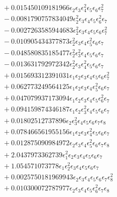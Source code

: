 \documentclass[10pt]{article}
\begin{document}
\begin{align*}
&{}  + 0.015450109181966 \epsilon_{2} \epsilon_{3} \epsilon_{4}^{2} \epsilon_{5} \epsilon_{6} \epsilon_{7}^{2} \\
&{}  - 0.0081790757834049 \epsilon_{2}^{2} \epsilon_{3} \epsilon_{4} \epsilon_{5} \epsilon_{6}^{2} \epsilon_{7} \\
&{}  - 0.0027263585944683 \epsilon_{2}^{2} \epsilon_{3} \epsilon_{4} \epsilon_{5} \epsilon_{6} \epsilon_{7}^{2} \\
&{}  - 0.010905434377873 \epsilon_{2}^{2} \epsilon_{3} \epsilon_{4} \epsilon_{5}^{2} \epsilon_{6} \epsilon_{7} \\
&{}  - 0.048580835185477 \epsilon_{2}^{2} \epsilon_{3}^{2} \epsilon_{4} \epsilon_{5} \epsilon_{6} \epsilon_{7} \\
&{}  - 0.013631792972342 \epsilon_{2}^{2} \epsilon_{3} \epsilon_{4}^{2} \epsilon_{5} \epsilon_{6} \epsilon_{7} \\
&{}  + 0.015693312391031 \epsilon_{1} \epsilon_{2} \epsilon_{3} \epsilon_{4} \epsilon_{5} \epsilon_{6} \epsilon_{7}^{2} \\
&{}  + 0.062773249564125 \epsilon_{1} \epsilon_{2} \epsilon_{3} \epsilon_{4} \epsilon_{5}^{2} \epsilon_{6} \epsilon_{7} \\
&{}  + 0.047079937173094 \epsilon_{1} \epsilon_{2} \epsilon_{3} \epsilon_{4} \epsilon_{5} \epsilon_{6}^{2} \epsilon_{7} \\
&{}  + 0.094159874346187 \epsilon_{1} \epsilon_{2} \epsilon_{3}^{2} \epsilon_{4} \epsilon_{5} \epsilon_{6} \epsilon_{7} \\
&{}  + 0.01802512737896 \epsilon_{2} \epsilon_{3}^{2} \epsilon_{4} \epsilon_{5} \epsilon_{6} \epsilon_{7} \epsilon_{8} \\
&{}  + 0.078466561955156 \epsilon_{1} \epsilon_{2} \epsilon_{3} \epsilon_{4}^{2} \epsilon_{5} \epsilon_{6} \epsilon_{7} \\
&{}  + 0.012875090984972 \epsilon_{2} \epsilon_{3} \epsilon_{4} \epsilon_{5}^{2} \epsilon_{6} \epsilon_{7} \epsilon_{8} \\
&{}  + 2.0437973362739 \epsilon_{1}^{2} \epsilon_{2} \epsilon_{3} \epsilon_{4} \epsilon_{5} \epsilon_{6} \epsilon_{7} \\
&{}  + 1.054571073778 \epsilon_{1} \epsilon_{2}^{2} \epsilon_{3} \epsilon_{4} \epsilon_{5} \epsilon_{6} \epsilon_{7} \\
&{}  + 0.0025750181969943 \epsilon_{2} \epsilon_{3} \epsilon_{4} \epsilon_{5} \epsilon_{6} \epsilon_{7} \epsilon_{8}^{2} \\
&{}  + 0.010300072787977 \epsilon_{2} \epsilon_{3} \epsilon_{4} \epsilon_{5} \epsilon_{6}^{2} \epsilon_{7} \epsilon_{8} \\

\end{align*}
\end{document}
